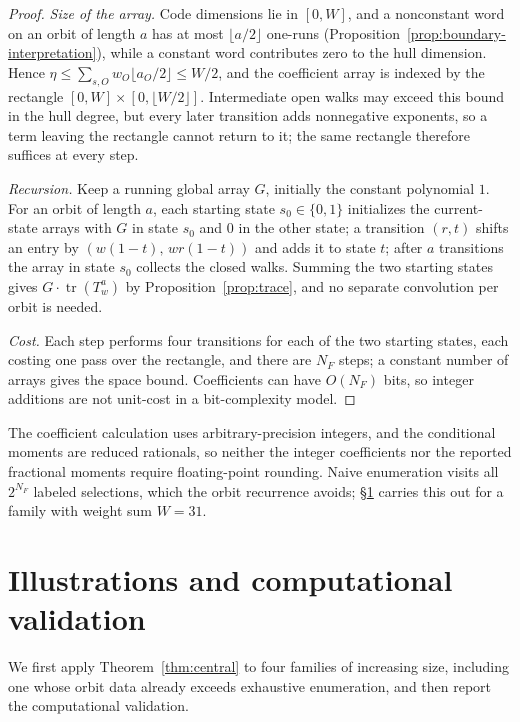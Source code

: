 \documentclass[10pt,a4paper]{article}
\numberwithin{equation}{section}
\theoremstyle{plain}
\theoremstyle{definition}
\theoremstyle{remark}
\begin{document}
\begin{proof}
\emph{Size of the array.} Code dimensions lie in $[0,W]$, and a nonconstant word
on an orbit of length $a$ has at most $\lfloor a/2\rfloor$ one-runs
(Proposition~\ref{prop:boundary-interpretation}), while a constant word
contributes zero to the hull dimension. Hence
$\eta\le\sum_{s,O}w_O\lfloor a_O/2\rfloor\le W/2$, and the coefficient array is
indexed by the rectangle $[0,W]\times[0,\lfloor W/2\rfloor]$. Intermediate open
walks may exceed this bound in the hull degree, but every later transition adds
nonnegative exponents, so a term leaving the rectangle cannot return to it; the
same rectangle therefore suffices at every step.

\emph{Recursion.} Keep a running global array $G$, initially the constant
polynomial $1$. For an orbit of length $a$, each starting state $s_0\in\{0,1\}$
initializes the current-state arrays with $G$ in state $s_0$ and $0$ in the other
state; a transition $(r,t)$ shifts an entry by $(w(1-t),\,wr(1-t))$ and adds it to
state $t$; after $a$ transitions the array in state $s_0$ collects the closed
walks. Summing the two starting states gives $G\cdot\operatorname{tr}(T_w^{a})$ by
Proposition~\ref{prop:trace}, and no separate convolution per orbit is needed.

\emph{Cost.} Each step performs four transitions for each of the two starting
states, each costing one pass over the rectangle, and there are $N_F$ steps;
a constant number of arrays gives the space bound. Coefficients can have
$O(N_F)$ bits, so integer additions are not unit-cost in a bit-complexity model.
\end{proof}

The coefficient calculation uses arbitrary-precision integers, and the
conditional moments are reduced rationals, so neither the integer coefficients
nor the reported fractional moments require floating-point rounding. Naive
enumeration visits all $2^{N_F}$ labeled selections, which the orbit recurrence
avoids; \S\ref{sec:examples} carries this out for a family with weight sum $W=31$.

\section{Illustrations and computational validation}\label{sec:examples}

We first apply Theorem~\ref{thm:central} to four families of increasing size,
including one whose orbit data already exceeds exhaustive enumeration, and then
report the computational validation.
\end{document}
